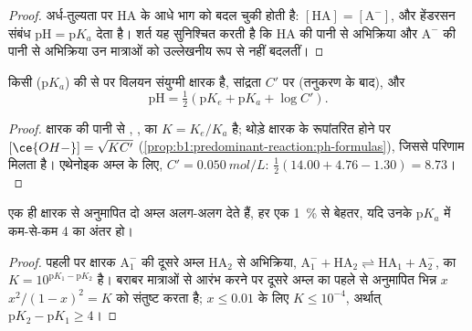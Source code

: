\begin{proof}
अर्ध-तुल्यता पर  
HA के आधे भाग को बदल चुकी होती है: $[\mathrm{HA}] = [\mathrm{A^-}]$, और
हेंडरसन संबंध $\mathrm{pH} = \mathrm{p}K_a$ देता है। शर्त
यह सुनिश्चित करती है कि HA की पानी से अभिक्रिया और $\mathrm{A^-}$ की
पानी से अभिक्रिया उन मात्राओं को उल्लेखनीय रूप से नहीं बदलतीं।
\end{proof}

\begin{proposition}[दुर्बल अम्ल की तुल्यता पर pH]\label{prop:b1:titration-methods:ph-at-equivalence}
किसी  ($\mathrm{p}K_a$) की  से  पर
विलयन संयुग्मी क्षारक है, सांद्रता $C'$ पर (तनुकरण के बाद), और
\[
  \mathrm{pH} = \tfrac12(\mathrm{p}K_e + \mathrm{p}K_a + \log C') .
\]
\end{proposition}

\begin{proof}
क्षारक की पानी से ,
, का $K = K_e/K_a$ है; थोड़े क्षारक के
रूपांतरित होने पर $[\ce{OH-}] = \sqrt{KC'}$ (\cref{prop:b1:predominant-reaction:ph-formulas}),
जिससे परिणाम मिलता है। एथेनोइक अम्ल के लिए, $C' = \qty{0.050}{mol/L}$:
$\frac12(14.00 + 4.76 - 1.30) = 8.73$।
\end{proof}

\begin{proposition}[क्रमिक अनुमापन]\label{prop:b1:titration-methods:successive}
एक ही क्षारक से अनुमापित दो अम्ल अलग-अलग  देते हैं, हर एक
\qty{1}{\percent} से बेहतर, यदि उनके $\mathrm{p}K_a$ में कम-से-कम 4 का अंतर हो।
\end{proposition}

\begin{proof}
पहली  पर क्षारक $\mathrm{A_1^-}$ की
दूसरे अम्ल $\mathrm{HA_2}$ से अभिक्रिया, $\mathrm{A_1^-} + \mathrm{HA_2}
\rightleftharpoons \mathrm{HA_1} + \mathrm{A_2^-}$, का $K = 10^{\mathrm{p}K_1 - \mathrm{p}K_2}$ है।
बराबर मात्राओं से आरंभ करने पर दूसरे अम्ल का पहले से अनुमापित भिन्न $x$
$x^2/(1 - x)^2 = K$ को संतुष्ट करता है; $x \leqslant 0.01$ के लिए $K
\leqslant 10^{-4}$, अर्थात् $\mathrm{p}K_2 - \mathrm{p}K_1 \geqslant 4$।
\end{proof}

